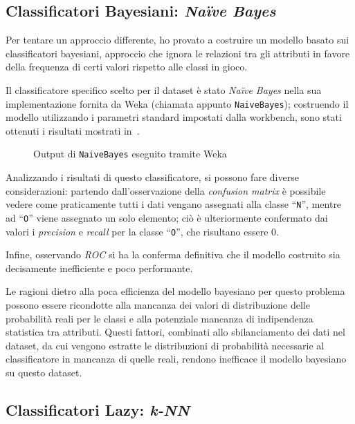 \subsection{Classificatori Bayesiani: \emph{Naïve Bayes}}\label{subsec:bayes}

Per tentare un approccio differente, ho provato a costruire un modello basato sui classificatori bayesiani,
approccio che ignora le relazioni tra gli attributi in favore della frequenza di certi valori rispetto alle classi in gioco.

Il classificatore specifico scelto per il dataset è stato \emph{Naïve Bayes} nella sua implementazione fornita da Weka (chiamata appunto \texttt{NaiveBayes});
costruendo il modello utilizzando i parametri standard impostati dalla workbench, sono stati ottenuti i risultati mostrati in~.

\begin{figure}[H]
  \centering
  \caption{Output di \texttt{NaiveBayes} eseguito tramite Weka}%
  \label{fig:bayes}
\end{figure}

Analizzando i risultati di questo classificatore, si possono fare diverse considerazioni:
partendo dall'osservazione della \emph{confusion matrix} è possibile vedere come praticamente tutti i dati vengano assegnati alla classe ``\texttt{N}'', mentre ad ``\texttt{O}'' viene assegnato un solo elemento;
ciò è ulteriormente confermato dai valori i \emph{precision} e \emph{recall} per la classe ``\texttt{O}'', che risultano essere \(0\).

Infine, osservando \emph{ROC} si ha la conferma definitiva che il modello costruito sia decisamente inefficiente e poco performante.

Le ragioni dietro alla poca efficienza del modello bayesiano per questo problema possono essere ricondotte alla mancanza dei valori di distribuzione delle probabilità reali per le classi e alla potenziale mancanza di indipendenza statistica tra attributi.
Questi fattori, combinati allo sbilanciamento dei dati nel dataset, da cui vengono estratte le distribuzioni di probabilità necessarie al classificatore in mancanza di quelle reali, rendono inefficace il modello bayesiano su questo dataset.

\subsection{Classificatori Lazy: \emph{k-NN}}\label{subsec:ibk}

